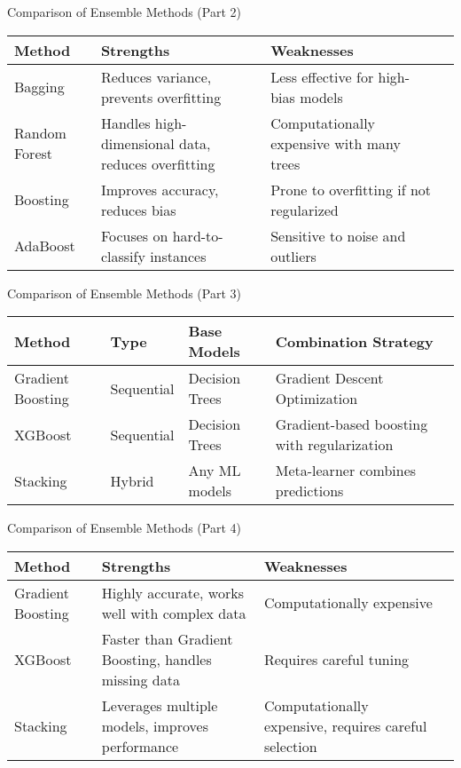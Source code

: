 \documentclass[serif, aspectratio=169]{beamer}
\begin{document}
\begin{frame}{Comparison of Ensemble Methods (Part 2)}
    \centering
    \renewcommand{\arraystretch}{1.2} %
    \begin{tabular}{|p{2cm}|p{3cm}|p{4cm}|p{4cm}|}
        \hline
        \textbf{Method} & \textbf{Strengths} & \textbf{Weaknesses} \\
        \hline
        Bagging & Reduces variance, prevents overfitting & Less effective for high-bias models \\
        \hline
        Random Forest & Handles high-dimensional data, reduces overfitting & Computationally expensive with many trees \\
        \hline
        Boosting & Improves accuracy, reduces bias & Prone to overfitting if not regularized \\
        \hline
        AdaBoost & Focuses on hard-to-classify instances & Sensitive to noise and outliers \\
        \hline
    \end{tabular}
\end{frame}

\begin{frame}{Comparison of Ensemble Methods (Part 3)}
    \centering
    \renewcommand{\arraystretch}{1.2} %
    \begin{tabular}{|p{2cm}|p{2cm}|p{3cm}|p{4cm}|}
        \hline
        \textbf{Method} & \textbf{Type} & \textbf{Base Models} & \textbf{Combination Strategy} \\
        \hline
        Gradient Boosting & Sequential & Decision Trees & Gradient Descent Optimization \\
        \hline
        XGBoost & Sequential & Decision Trees & Gradient-based boosting with regularization \\
        \hline
        Stacking & Hybrid & Any ML models & Meta-learner combines predictions \\
        \hline
    \end{tabular}
\end{frame}

\begin{frame}{Comparison of Ensemble Methods (Part 4)}
    \centering
    \renewcommand{\arraystretch}{1.2} %
    \begin{tabular}{|p{2cm}|p{3cm}|p{4cm}|p{4cm}|}
        \hline
        \textbf{Method} & \textbf{Strengths} & \textbf{Weaknesses} \\
        \hline
        Gradient Boosting & Highly accurate, works well with complex data & Computationally expensive \\
        \hline
        XGBoost & Faster than Gradient Boosting, handles missing data & Requires careful tuning \\
        \hline
        Stacking & Leverages multiple models, improves performance & Computationally expensive, requires careful selection \\
        \hline
    \end{tabular}
\end{frame}
\end{document}
